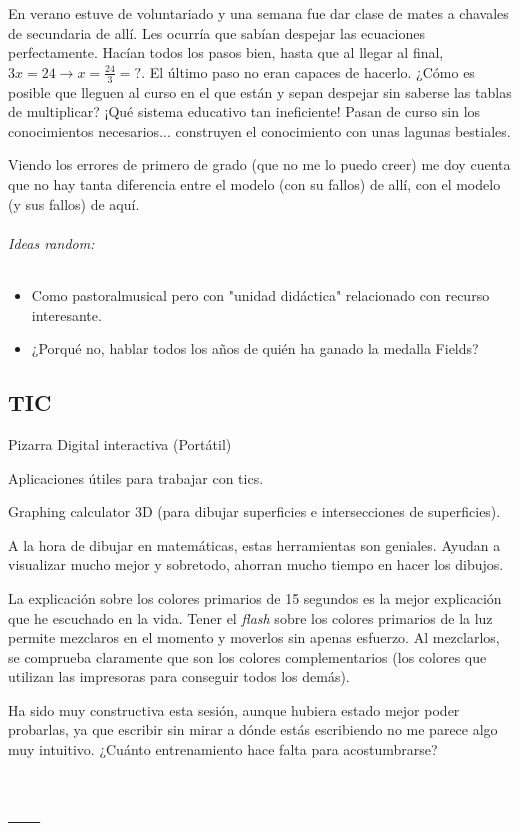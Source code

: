 \documentclass[palatino]{apuntes}
\begin{document}
En verano estuve de voluntariado y una semana fue dar clase de mates a chavales de secundaria de allí. 
%
Les ocurría que sabían despejar las ecuaciones perfectamente. Hacían todos los pasos bien, hasta que al llegar al final, $3x = 24 \to x=\frac{24}{3} = ?$. 
%
El último paso no eran capaces de hacerlo. ¿Cómo es posible que lleguen al curso en el que están y sepan despejar sin saberse las tablas de multiplicar? 
%
¡Qué sistema educativo tan ineficiente! 
%
Pasan de curso sin los conocimientos necesarios... construyen el conocimiento con unas lagunas bestiales.

Viendo los errores de primero de grado (que no me lo puedo creer) me doy cuenta que no hay tanta diferencia entre el modelo (con su fallos) de allí, con el modelo (y sus fallos) de aquí.

\subparagraph{Ideas random:}

\begin{itemize}
	\item Como pastoralmusical pero con "unidad didáctica" relacionado con recurso interesante.
	\item ¿Porqué no, hablar todos los años de quién ha ganado la medalla Fields?
\end{itemize}




\section{TIC}

\begin{defn}[PDi(P)]
Pizarra Digital interactiva (Portátil)
\end{defn}

Aplicaciones útiles para trabajar con tics.

Graphing calculator 3D (para dibujar superficies e intersecciones de superficies).

A la hora de dibujar en matemáticas, estas herramientas son geniales. Ayudan a visualizar mucho mejor y sobretodo, ahorran mucho tiempo en hacer los dibujos.

La explicación sobre los colores primarios de 15 segundos es la mejor explicación que he escuchado en la vida. 
%
Tener el \textit{flash} sobre los colores primarios de la luz permite mezclaros en el momento y moverlos sin apenas esfuerzo. 
%
Al mezclarlos, se comprueba claramente que son los colores complementarios (los colores que utilizan las impresoras para conseguir todos los demás).

Ha sido muy constructiva esta sesión, aunque hubiera estado mejor poder probarlas, ya que escribir sin mirar a dónde estás escribiendo no me parece algo muy intuitivo. 
%
¿Cuánto entrenamiento hace falta para acostumbrarse?



\appendix

\chapter{---}


\printindex
\end{document}
